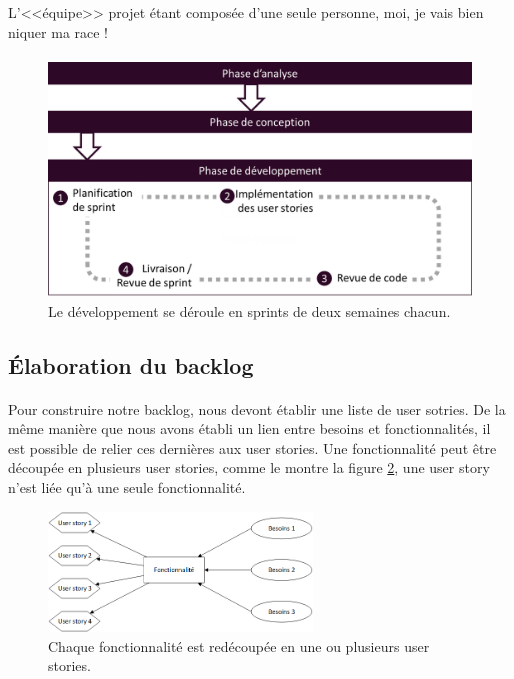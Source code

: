 			L'<<équipe>> projet étant composée d'une seule personne, moi, je vais bien
			niquer ma race !
			
			\paragraph{}%
			
			\paragraph{}%
			
			
			
			\begin{figure}[H]%
				\centering
				\includegraphics[width=15cm]{../img/part3/methodo_dev.png}
				\caption{\label{methodo_dev} Le développement se déroule en sprints de
				deux semaines chacun.}
			\end{figure}
		
		\subsection{Élaboration du backlog}
			\paragraph{}%
			
			
			Pour construire notre backlog, nous devont établir une liste de user sotries.
			De la même manière que nous avons établi un lien entre besoins et
			fonctionnalités, il est possible de relier ces dernières aux user stories.
			Une fonctionnalité peut être découpée en plusieurs user stories, comme le
			montre la figure \ref{mapping_fonctios_us}, une user story n'est liée qu'à
			une seule fonctionnalité.
			\begin{figure}[H]%
				\centering
				\includegraphics[width=7cm]{../img/part3/mapping_fonctios_us.png}
				\caption{\label{mapping_fonctios_us} Chaque fonctionnalité est redécoupée
				en une ou plusieurs user stories.}
			\end{figure}
			
